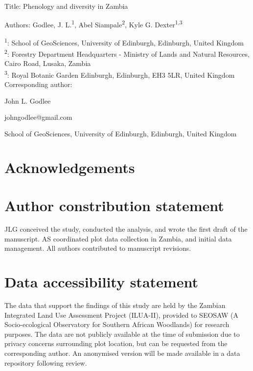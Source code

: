 \documentclass[11pt,a4paper]{article}
\newcommand{\titletext}{Phenology and diversity in Zambia}
\begin{document}
{\Large{Title: \titletext{}}}

Authors: Godlee, J. L.\textsuperscript{1}, Abel Siampale\textsuperscript{2}, Kyle G. Dexter\textsuperscript{1,3}

\textsuperscript{1}: School of GeoSciences, University of Edinburgh, Edinburgh, United Kingdom \\
\textsuperscript{2}: Forestry Department Headquarters - Ministry of Lands and Natural Resources, Cairo Road, Lusaka, Zambia \\
\textsuperscript{3}: Royal Botanic Garden Edinburgh, Edinburgh, EH3 5LR, United Kingdom \\


\vspace{1em}
Corresponding author:

John L. Godlee

johngodlee@gmail.com

School of GeoSciences, University of Edinburgh, Edinburgh, United Kingdom

\section*{Acknowledgements}

\section*{Author constribution statement}

JLG conceived the study, conducted the analysis, and wrote the first draft of the manuscript. AS coordinated plot data collection in Zambia, and initial data management. All authors contributed to manuscript revisions.  

\section*{Data accessibility statement}

The data that support the findings of this study are held by the Zambian Integrated Land Use Assessment Project (ILUA-II), provided to SEOSAW (A Socio-ecological Observatory for Southern African Woodlands) for research purposes. The data are not publicly available at the time of submission due to privacy concerns surrounding plot location, but can be requested from the corresponding author. An anonymised version will be made available in a data repository following review.

\newpage{}
\linenumbers
\end{document}
